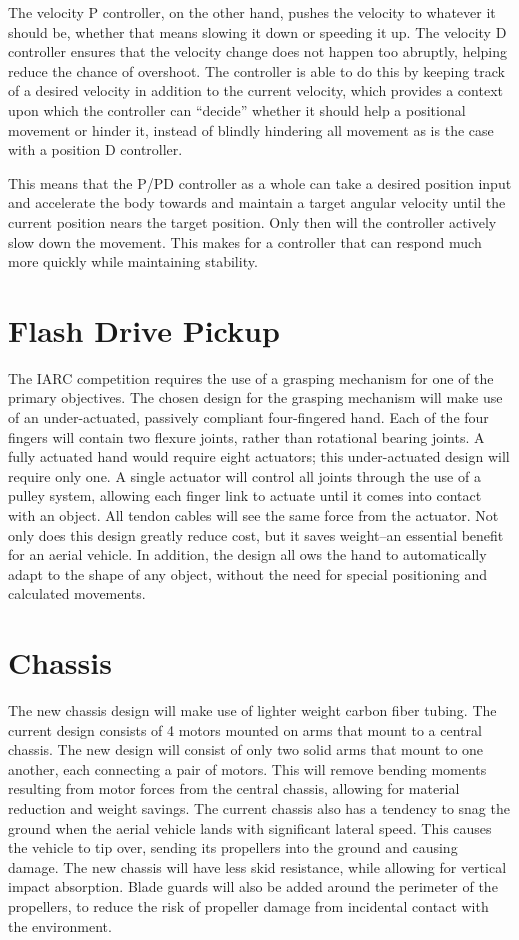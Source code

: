 \documentclass[12pt,letterpaper]{article}
\begin{document}
The velocity P controller, on the other hand, pushes the velocity to whatever
it should be, whether that means slowing it down or speeding it up. The
velocity D controller ensures that the velocity change does not happen too
abruptly, helping reduce the chance of overshoot. The controller is able to do
this by keeping track of a desired velocity in addition to the current
velocity, which provides a context upon which the controller can ``decide''
whether it should help a positional movement or hinder it, instead of blindly
hindering all movement as is the case with a position D controller.

This means that the P/PD controller as a whole can take a desired position
input and accelerate the body towards and maintain a target angular velocity
until the current position nears the target position. Only then will the
controller actively slow down the movement. This makes for a controller that
can respond much more quickly while maintaining stability.


\section{Flash Drive Pickup}
The IARC competition requires the use of a grasping mechanism for one of the 
primary objectives.  The chosen design for the grasping mechanism will make use 
of an under-actuated, passively compliant four-fingered hand.  Each of the four 
fingers will contain two flexure joints, rather than rotational bearing joints. 
A fully actuated hand would require eight actuators; this under-actuated design 
will require only one.  A single actuator will control all joints through the 
use of a pulley system, allowing each finger link to actuate until it comes into
 contact with an object.  All tendon cables will see the same force from the 
actuator.  Not only does this design greatly reduce cost, but it saves 
weight--an essential benefit for an aerial vehicle.  In addition, the design all
ows the hand to automatically adapt to the shape of any object, without the need
 for special positioning and calculated movements.  

\section{Chassis}
The new chassis design will make use of lighter weight carbon fiber tubing.  The
 current design consists of 4 motors mounted on arms that mount to a central 
chassis.  The new design will consist of only two solid arms that mount to one 
another, each connecting a pair of motors.  This will remove bending moments 
resulting from motor forces from the central chassis, allowing for material 
reduction and weight savings.  The current chassis also has a tendency to snag 
the ground when the aerial vehicle lands with significant lateral speed.  This 
causes the vehicle to tip over, sending its propellers into the ground and 
causing damage.  The new chassis will have less skid resistance, while allowing 
for vertical impact absorption.  Blade guards will also be added around the 
perimeter of the propellers, to reduce the risk of propeller damage from 
incidental contact with the environment.
\end{document}
